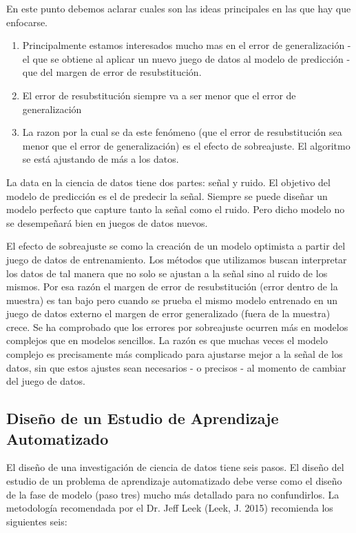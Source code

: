 \documentclass[letterpaper, spanish, 11pt]{report}
\begin{document}
En este punto debemos aclarar cuales son las ideas principales en las que hay que enfocarse.

\begin{enumerate}
	\item Principalmente estamos interesados mucho mas en el error de generalización - el que se obtiene al aplicar un nuevo juego de datos al modelo de predicción - que del margen de error de resubstitución.
	\item El error de resubstitución siempre va a ser menor que el error de generalización
	\item La razon por la cual se da este fenómeno (que el error de resubstitución sea menor que el error de generalización) es el efecto de sobreajuste. El algoritmo se está ajustando de más a los datos.
\end{enumerate}

La data en la ciencia de datos tiene dos partes: señal y ruido. El objetivo del modelo de predicción es el de predecir la señal. Siempre se puede diseñar un modelo perfecto que capture tanto la señal como el ruido. Pero dicho modelo no se desempeñará bien en juegos de datos nuevos.

El efecto de sobreajuste se como la creación de un modelo optimista a partir del juego de datos de entrenamiento. Los métodos que utilizamos buscan interpretar los datos de tal manera que no solo se ajustan a la señal sino al ruido de los mismos. Por esa razón el margen de error de resubstitución (error dentro de la muestra) es tan bajo pero cuando se prueba el mismo modelo entrenado en un juego de datos externo el margen de error generalizado (fuera de la muestra) crece. Se ha comprobado que los errores por sobreajuste ocurren más en modelos complejos que en modelos sencillos. La razón es que muchas veces el modelo complejo es precisamente más complicado para ajustarse mejor a la señal de los datos, sin que estos ajustes sean necesarios - o precisos - al momento de cambiar del juego de datos.

\subsection{Diseño de un Estudio de Aprendizaje Automatizado}
El diseño de una investigación de ciencia de datos tiene seis pasos. El diseño del estudio de un problema de aprendizaje automatizado debe verse como el diseño de la fase de modelo (paso tres) mucho más detallado para no confundirlos. La metodología recomendada por el Dr. Jeff Leek (Leek, J. 2015) recomienda los siguientes seis:
\end{document}
